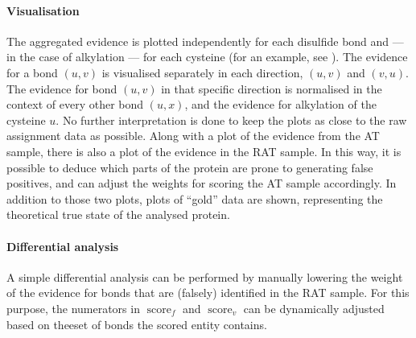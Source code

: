 \paragraph{Visualisation} The aggregated evidence is plotted independently for each disulfide bond and --- in the case of alkylation --- for each cysteine (for an example, see ). The evidence for a bond \((u, v)\) is visualised separately in each direction, \((u, v)\) and \((v, u)\). The evidence for bond \((u, v)\) in that specific direction is normalised in the context of every other bond \((u, x)\), and the evidence for alkylation of the cysteine \(u\). No further interpretation is done to keep the plots as close to the raw assignment data as possible. Along with a plot of the evidence from the AT sample, there is also a plot of the evidence in the RAT sample. In this way, it is possible to deduce which parts of the protein are prone to generating false positives, and can adjust the weights for scoring the AT sample accordingly. In addition to those two plots, plots of ``gold'' data are shown, representing the theoretical true state of the analysed protein.

\paragraph{Differential analysis} A simple differential analysis can be performed by manually lowering the weight of the evidence for bonds that are (falsely) identified in the RAT sample. For this purpose, the numerators in \(\operatorname{score}_f\) and \(\operatorname{score}_v\) can be dynamically adjusted based on theeset of bonds the scored entity contains.